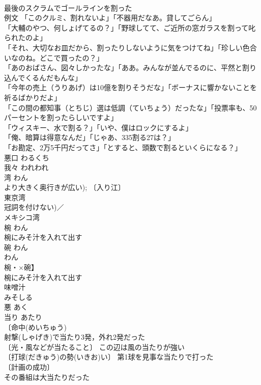 \documentclass[8pt]{extreport}
\begin{document}
\begin{CJK}{UTF8}{min}
\\	最後のスクラムでゴールラインを割った 
\\	例文 「このクルミ、割れないよ」「不器用だなあ。貸してごらん」 
\\	「大輔のやつ、何しょげてるの？」「野球してて、ご近所の窓ガラスを割って叱られたのよ」 
\\	「それ、大切なお皿だから、割ったりしないように気をつけてね」「珍しい色合いなのね。どこで買ったの？」 
\\	「あのおばさん、図々しかったな」「ああ。みんなが並んでるのに、平然と割り込んでくるんだもんな」 
\\	「今年の売上（うりあげ）は10億を割りそうだな」「ボーナスに響かないことを祈るばかりだよ」 
\\	「この間の都知事（とちじ）選は低調（ていちょう）だったな」「投票率も、50パーセントを割ったらしいですよ」 
\\	「ウィスキー、水で割る？」「いや、僕はロックにするよ」 
\\	「俺、暗算は得意なんだ」「じゃあ、335割る27は？」 
\\	「お勘定、2万5千円だってさ」「とすると、頭数で割るといくらになる？」 
\\	悪口	わるくち	
\\	我々	われわれ	
\\	湾	わん	
\\	より大きく奥行きが広い); 〔入り江〕
\\	東京湾 
\\	冠詞を付けない)／
\\	メキシコ湾 
\\	椀	わん	
\\	椀にみそ汁を入れて出す 
\\	碗	わん	
\\	わん
\\	椀・×碗】 
\\	椀にみそ汁を入れて出す 
\\	味噌汁 
\\	みそしる
\\	悪	あく	
\\	当り	あたり	
\\	〔命中(めいちゅう)　
\\	射撃(しゃげき)で当たり3発，外れ2発だった 
\\	〔光・風などが当たること〕 この辺は風の当たりが強い 
\\	〔打球(だきゅう)の勢(いきお)い〕 第1球を見事な当たりで打った 
\\	〔計画の成功〕
\\	その番組は大当たりだった 

\end{CJK}
\end{document}
